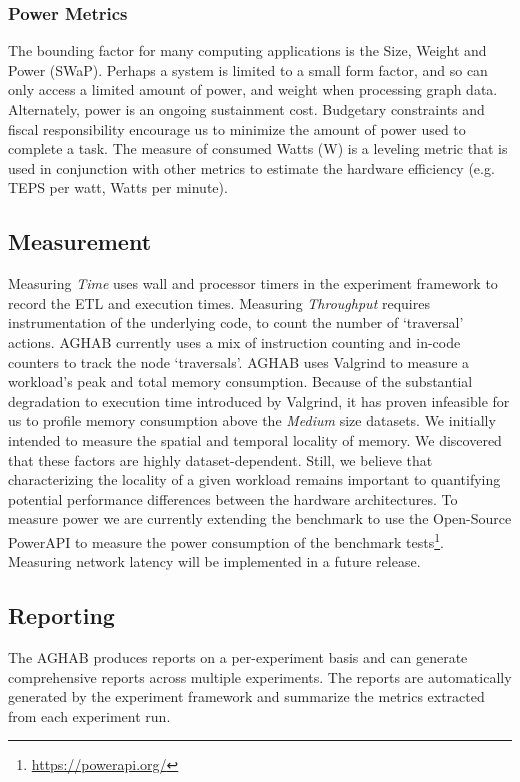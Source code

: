     \subsubsection{Power Metrics}
    The bounding factor for many computing applications is the Size, Weight and Power (SWaP). 
    Perhaps a system is limited to a small form factor, and so can only access a limited amount of power, and weight when processing graph data. 
    Alternately, power is an ongoing sustainment cost. 
    Budgetary constraints and fiscal responsibility encourage us to minimize the amount of power used to complete a task. 
    The measure of consumed Watts (W) is a leveling metric that is used in conjunction with other metrics to estimate the hardware efficiency (e.g. TEPS per watt, Watts per minute).

    \subsection{Measurement}

    Measuring \textit{Time} uses wall and processor timers in the experiment framework to record the ETL and execution times. 
    Measuring \textit{Throughput} requires instrumentation of the underlying code, to count the number of `traversal' actions.
    AGHAB currently uses a mix of instruction counting and in-code counters to track the node `traversals'. 
    AGHAB uses Valgrind to measure a workload's peak and total memory consumption. Because of the substantial degradation to execution time introduced by Valgrind, it has proven infeasible for us to profile memory consumption above the \textit{Medium} size datasets. 
    We initially intended to measure the spatial and temporal locality of memory. We discovered that these factors are highly dataset-dependent. Still, we believe that characterizing the locality of a given workload remains important to quantifying potential performance differences between the hardware architectures. 
    To measure power we are currently extending the benchmark to use the Open-Source PowerAPI to measure the power consumption of the benchmark tests\footnote{\url{https://powerapi.org/}}. 
    Measuring network latency will be implemented in a future release.

    \subsection{Reporting}
    The AGHAB produces reports on a per-experiment basis and can generate comprehensive reports across multiple experiments. 
    The reports are automatically generated by the experiment framework and summarize the metrics extracted from each experiment run. 